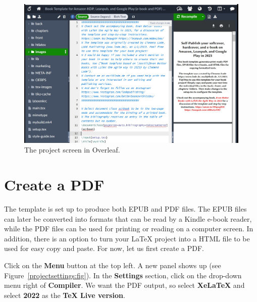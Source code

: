 \begin{figure}[H]\centering
\includegraphics[width=\textwidth]{images/overleaf.jpg}
\caption{The project screen in Overleaf.}
\label{overleaf:fig}
\end{figure}



\section{Create a PDF}
\label{createpdfoutput:sec}

The template is set up to produce both EPUB and PDF files. The EPUB files can later be converted into formats that can be read by a Kindle e-book reader, while the PDF files can be used for printing or reading on a computer screen. In addition, there is an option to turn your LaTeX project into a HTML file to be used for easy copy and paste. For now, let us first create a PDF.

Click on the \textbf{Menu} button at the top left. A new panel shows up (see Figure~\ref{projectsettings:fig}). In the \textbf{Settings} section, click on the drop-down menu right of \textbf{Compiler}. We want the PDF output, so select \textbf{XeLaTeX} and select \textbf{2022} as the \textbf{TeX Live version}.

